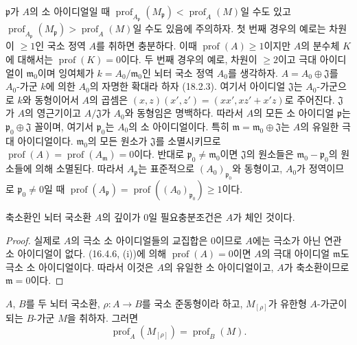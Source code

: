 \begin{env}[16.4.6.4]
\label{0.16.4.6.4-fr}
$\mathfrak{p}$가 $A$의 소 아이디얼일 때
$\operatorname{prof}_{A_{\mathfrak{p}}}(M_{\mathfrak{p}})
<\operatorname{prof}_A(M)$일 수도 있고
$\operatorname{prof}_{A_{\mathfrak{p}}}(M_{\mathfrak{p}})
>\operatorname{prof}_A(M)$일 수도 있음에 주의하자. 첫 번째 경우의
예로는
차원이 $\geq1$인 국소 정역 $A$를 취하면 충분하다. 이때
$\operatorname{prof}(A)\geq1$이지만 $A$의 분수체 $K$에 대해서는
$\operatorname{prof}(K)=0$이다. 두 번째 경우의 예로, 차원이
$\geq2$이고 극대 아이디얼이 $\mathfrak{m}_0$이며 잉여체가
$k=A_0/\mathfrak{m}_0$인 뇌터 국소 정역 $A_0$를 생각하자.
$A=A_0\oplus\mathfrak{J}$를 $A_0$-가군 $k$에 의한 $A_0$의 자명한
확대라 하자 (18.2.3). 여기서 아이디얼 $\mathfrak{J}$는 $A_0$-가군으로
$k$와 동형이어서 $A$의 곱셈은
$(x,z)(x',z')=(xx',xz'+x'z)$로 주어진다. $\mathfrak{J}$가 $A$의
영근기이고 $A/\mathfrak{J}$가 $A_0$와 동형임은 명백하다. 따라서
$A$의 모든 소 아이디얼 $\mathfrak{p}$는
$\mathfrak{p}_0\oplus\mathfrak{J}$ 꼴이며, 여기서
$\mathfrak{p}_0$는 $A_0$의 소 아이디얼이다. 특히
$\mathfrak{m}=\mathfrak{m}_0\oplus\mathfrak{J}$는 $A$의 유일한 극대
아이디얼이다. $\mathfrak{m}_0$의 모든 원소가 $\mathfrak{J}$를
소멸시키므로
$\operatorname{prof}(A)=\operatorname{prof}(A_{\mathfrak{m}})=0$이다.
반대로 $\mathfrak{p}_0\neq\mathfrak{m}_0$이면 $\mathfrak{J}$의
원소들은 $\mathfrak{m}_0-\mathfrak{p}_0$의 원소들에 의해 소멸된다.
따라서 $A_{\mathfrak{p}}$는 표준적으로
$(A_0)_{\mathfrak{p}_0}$와 동형이고, $A_0$가 정역이므로
$\mathfrak{p}_0\neq0$일 때
$\operatorname{prof}(A_{\mathfrak{p}})
=\operatorname{prof}((A_0)_{\mathfrak{p}_0})\geq1$이다.
\end{env}

\begin{corollary}[16.4.7]
\label{0.16.4.7-fr}
축소환인 뇌터 국소환 $A$의 깊이가 0일 필요충분조건은 $A$가 체인 것이다.
\end{corollary}

\begin{proof}
실제로 $A$의 극소 소 아이디얼들의 교집합은 0이므로 $A$에는 극소가
아닌 연관 소 아이디얼이 없다. (16.4.6, (i))에 의해
$\operatorname{prof}(A)=0$이면 $A$의 극대 아이디얼
$\mathfrak{m}$도 극소 소 아이디얼이다. 따라서 이것은 $A$의 유일한
소 아이디얼이고, $A$가 축소환이므로 $\mathfrak{m}=0$이다.
\end{proof}

\begin{proposition}[16.4.8]
\label{0.16.4.8-fr}
$A$, $B$를 두 뇌터 국소환, $\rho:A\to B$를 국소 준동형이라 하고,
$M_{[\rho]}$가 유한형 $A$-가군이 되는 $B$-가군 $M$을 취하자. 그러면
\begin{equation}
\label{0.16.4.8.1-fr}
\tag{16.4.8.1}
  \operatorname{prof}_A(M_{[\rho]})=\operatorname{prof}_B(M).
\end{equation}
\end{proposition}

